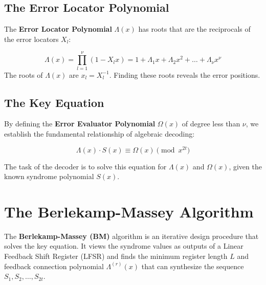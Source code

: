 \documentclass[12pt,a4paper]{article}
\begin{document}
\subsection{The Error Locator Polynomial}
The \textbf{Error Locator Polynomial} $\Lambda(x)$ has roots that are the reciprocals of the error locators $X_l$:
\begin{tcolorbox}[defbox, title={\textbf{Error Locator Polynomial}}]
\[ \Lambda(x) = \prod_{l=1}^\nu (1 - X_l x) = 1 + \Lambda_1 x + \Lambda_2 x^2 + \dots + \Lambda_\nu x^\nu \]
The roots of $\Lambda(x)$ are $x_l = X_l^{-1}$. Finding these roots reveals the error positions.
\end{tcolorbox}

\subsection{The Key Equation}
By defining the \textbf{Error Evaluator Polynomial} $\Omega(x)$ of degree less than $\nu$, we establish the fundamental relationship of algebraic decoding:
\begin{tcolorbox}[formulabox, title={\textbf{The Key Equation of Decoding}}]
\[ \Lambda(x) \cdot S(x) \equiv \Omega(x) \pmod{x^{2t}} \]
\end{tcolorbox}
The task of the decoder is to solve this equation for $\Lambda(x)$ and $\Omega(x)$, given the known syndrome polynomial $S(x)$.

\section{The Berlekamp-Massey Algorithm}

The \textbf{Berlekamp-Massey (BM)} algorithm is an iterative design procedure that solves the key equation. It views the syndrome values as outputs of a Linear Feedback Shift Register (LFSR) and finds the minimum register length $L$ and feedback connection polynomial $\Lambda^{(r)}(x)$ that can synthesize the sequence $S_1, S_2, \dots, S_{2t}$.
\end{document}

